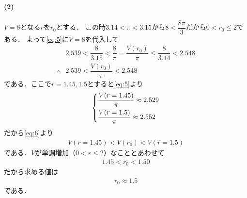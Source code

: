 \documentclass[../../main.tex]{subfiles}
\begin{document}
\paragraph{(2)}

$V=8$となる$r$を$r_0$とする．
この時$3.14<\pi<3.15$から$8<\dfrac{8\pi}{3}$だから$0<r_0\le 2$である．
よって\cref{eq:5}に$V=8$を代入して
\begin{align}
  & 2.539<\dfrac{8}{3.15}<\dfrac{8}{\pi}= \dfrac{V(r_0)}{\pi} \le \dfrac{8}{3.14}<2.548 \\
  \therefore
  & 2.539 < \dfrac{V(r_0)}{\pi} < 2.548 \label{eq:6}
\end{align}
である．ここで$r=1.45,1.5$とすると\cref{eq:5}より
\begin{align}
  \begin{dcases}
    \dfrac{V(r=1.45)}{\pi} \approx 2.529 \\
    \dfrac{V(r=1.5)}{\pi}  \approx 2.552
  \end{dcases}
\end{align}
だから\cref{eq:6}より
\begin{align}
  V(r=1.45) < V(r_0) < V(r=1.5)
\end{align}
である．$V$が単調増加（$0< r\le2$）なこととあわせて
\begin{align}
  1.45<r_0<1.50
\end{align}
だから求める値は
\begin{align}
  r_0\approx1.5
\end{align}
である．
\end{document}
